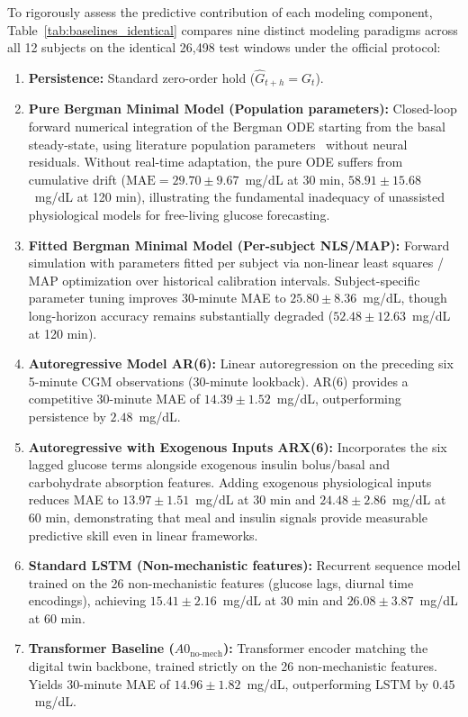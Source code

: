 \documentclass[journal]{IEEEtran}
\begin{document}
To rigorously assess the predictive contribution of each modeling component, Table~\ref{tab:baselines_identical} compares nine distinct modeling paradigms across all 12 subjects on the identical 26,498 test windows under the official protocol:
\begin{enumerate}
    \item \textbf{Persistence:} Standard zero-order hold ($\hat{G}_{t+h} = G_t$).
    \item \textbf{Pure Bergman Minimal Model (Population parameters):} Closed-loop forward numerical integration of the Bergman ODE starting from the basal steady-state, using literature population parameters~\cite{ref1,ref32} without neural residuals. Without real-time adaptation, the pure ODE suffers from cumulative drift ($\text{MAE} = 29.70 \pm 9.67$~mg/dL at 30 min, $58.91 \pm 15.68$~mg/dL at 120 min), illustrating the fundamental inadequacy of unassisted physiological models for free-living glucose forecasting.
    \item \textbf{Fitted Bergman Minimal Model (Per-subject NLS/MAP):} Forward simulation with parameters fitted per subject via non-linear least squares / MAP optimization over historical calibration intervals. Subject-specific parameter tuning improves 30-minute MAE to $25.80 \pm 8.36$~mg/dL, though long-horizon accuracy remains substantially degraded ($52.48 \pm 12.63$~mg/dL at 120 min).
    \item \textbf{Autoregressive Model AR(6):} Linear autoregression on the preceding six 5-minute CGM observations (30-minute lookback). AR(6) provides a competitive 30-minute MAE of $14.39 \pm 1.52$~mg/dL, outperforming persistence by $2.48$~mg/dL.
    \item \textbf{Autoregressive with Exogenous Inputs ARX(6):} Incorporates the six lagged glucose terms alongside exogenous insulin bolus/basal and carbohydrate absorption features. Adding exogenous physiological inputs reduces MAE to $13.97 \pm 1.51$~mg/dL at 30 min and $24.48 \pm 2.86$~mg/dL at 60 min, demonstrating that meal and insulin signals provide measurable predictive skill even in linear frameworks.
    \item \textbf{Standard LSTM (Non-mechanistic features):} Recurrent sequence model trained on the 26 non-mechanistic features (glucose lags, diurnal time encodings), achieving $15.41 \pm 2.16$~mg/dL at 30 min and $26.08 \pm 3.87$~mg/dL at 60 min.
    \item \textbf{Transformer Baseline ($A0_{\text{no-mech}}$):} Transformer encoder matching the digital twin backbone, trained strictly on the 26 non-mechanistic features. Yields 30-minute MAE of $14.96 \pm 1.82$~mg/dL, outperforming LSTM by $0.45$~mg/dL.

\end{enumerate}
\end{document}
